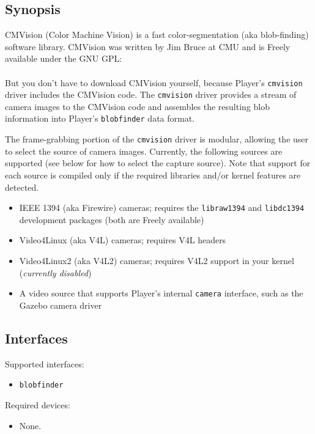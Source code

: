 
\subsection*{Synopsis}
CMVision (Color Machine Vision) is a fast color-segmentation (aka
blob-finding) software library.  CMVision was written by Jim Bruce at CMU
and is Freely available under the GNU GPL:\\
\\
But you don't have to download CMVision yourself, because Player's 
{\tt cmvision} driver includes the CMVision code.  The {\tt cmvision}
driver provides a stream of camera images to the CMVision code and
assembles the resulting blob information into Player's {\tt blobfinder}
data format.

The frame-grabbing portion of the {\tt cmvision} driver is modular,
allowing the user to select the source of camera images.  Currently, the
following sources are supported (see below for how to select the capture
source).  Note that support for each source is compiled only if the
required libraries and/or kernel features are detected.
\begin{itemize}
\item IEEE 1394 (aka Firewire) cameras; requires the {\tt libraw1394} and
{\tt libdc1394} development packages (both are Freely available)
\item Video4Linux (aka V4L) cameras; requires V4L headers
\item Video4Linux2 (aka V4L2) cameras; requires V4L2 support in your
kernel ({\em currently disabled})
\item A video source that supports Player's internal {\tt camera}
interface, such as the Gazebo camera driver
\end{itemize}

\subsection*{Interfaces}

\noindent Supported interfaces:
\begin{itemize}
\item {\tt blobfinder}
\end{itemize}

\noindent Required devices:
\begin{itemize}
\item None.
\end{itemize}

